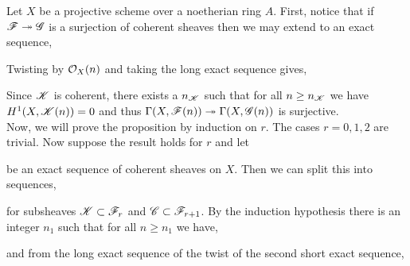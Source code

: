 \documentclass[12pt]{article}
\begin{document}
Let $X$ be a projective scheme over a noetherian ring $A$. First, notice that if $\mathscr{F} \twoheadrightarrow \mathscr{G}$ is a surjection of coherent sheaves then we may extend to an exact sequence,
\begin{center}
\end{center} 
Twisting by $\mathcal{O}_{X}(n)$ and taking the long exact sequence gives,
\begin{center}
\end{center}
Since $\mathscr{K}$ is coherent, there exists a $n_{\mathscr{K}}$ such that for all $n \ge n_{\mathscr{K}}$ we have $H^1(X, \mathscr{K}(n)) = 0$ and thus $\Gamma(X, \mathscr{F}(n)) \twoheadrightarrow \Gamma(X, \mathscr{G}(n))$ is surjective.
\bigskip\\
Now, we will prove the proposition by induction on $r$. The cases $r = 0,1,2$ are trivial. Now suppose the result holds for $r$ and let 
\begin{center}
\end{center}
be an exact sequence of coherent sheaves on $X$.
Then we can split this into sequences,
\begin{center}
\end{center}
for subsheaves $\mathscr{K} \subset \mathscr{F}_r$ and $\mathscr{C} \subset \mathscr{F}_{r+1}$. By the induction hypothesis there is an integer $n_1$ such that for all $n \ge n_1$ we have,
\begin{center}
\end{center}
and from the long exact sequence of the twist of the second short exact sequence,
\begin{center}
\end{center}
\end{document}
